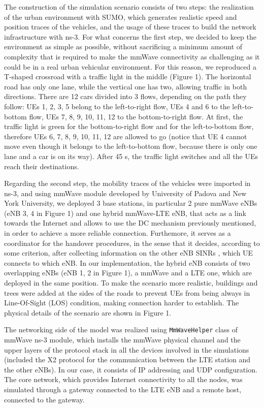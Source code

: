 \documentclass[conference,10pt]{IEEEtran}
\begin{document}
The construction of the simulation scenario consists of two steps: the realization of the urban environment with SUMO, which generates realistic speed and position traces of the vehicles, and the usage of these traces to build the network infrastructure with ns-3.
For what concerns the first step, we decided to keep the environment as simple as possible, without sacrificing a minimum amount of complexity that is required to make the mmWave connectivity as challenging as it could be in a real urban vehicular environment. For this reason, we reproduced a T-shaped crossroad with a traffic light in the middle (Figure 1). The horizontal road has only one lane, while the vertical one has two, allowing traffic in both directions. There are 12 cars divided into 3 flows, depending on the path they follow: UEs 1, 2, 3, 5 belong to the left-to-right flow, UEs 4 and 6 to the left-to-bottom flow, UEs 7, 8, 9, 10, 11, 12 to the bottom-to-right flow.
At first, the traffic light is green for the bottom-to-right flow and for the left-to-bottom flow, therefore UEs 6, 7, 8, 9, 10, 11, 12 are allowed to go (notice that UE 4 cannot move even though it belongs to the left-to-bottom flow, because there is only one lane and a car is on its way). After 45 s, the traffic light switches and all the UEs reach their destinations.


Regarding the second step, the mobility traces of the vehicles were imported in ns-3, and using mmWave module developed by University of Padova and New York University, we deployed 3 base stations, in particular 2 pure mmWave eNBs (eNB 3, 4 in Figure 1) and one hybrid mmWave-LTE eNB, that acts as a link towards the Internet and allows to use the DC mechanism previously mentioned, in order to achieve a more reliable connection. Furthemore, it serves as a coordinator for the handover procedures, in the sense that it decides, according to some criterion, after collecting information on the other eNB SINRs , which UE connects to which eNB. In our implementation, the hybrid eNB consists of two overlapping eNBs (eNB 1, 2 in Figure 1), a mmWave and a LTE one, which are deployed in the same position. To make the scenario more realistic, buildings and trees were added at the sides of the roads to prevent UEs from being always in Line-Of-Sight (LOS) condition, making connection harder to establish. The physical details of the scenario are shown in Figure 1.


The networking side of the model was realized using \texttt{MmWaveHelper} class of mmWave ns-3 module, which installs the mmWave physical channel and the upper layers of the protocol stack in all the devices involved in the simulations (included the X2 protocol for the communication between the LTE station and the other eNBs). In our case, it consists of IP addressing and UDP configuration. The core network, which provides Internet connectivity to all the nodes, was simulated through a gateway connected to the LTE eNB and a remote host, connected to the gateway. 
\end{document}
